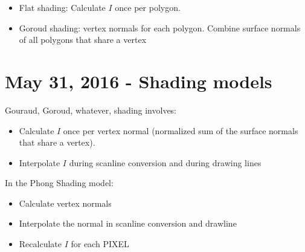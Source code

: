 \documentclass[11pt,fleqn]{article}
\theoremstyle{definition}
\begin{document}
\begin{itemize}
    \item Flat shading: Calculate $I$ once per polygon.
    \item Goroud shading: vertex normals for each polygon. Combine surface normals of
        all polygons that share a vertex
\end{itemize}

\section{May 31, 2016 - Shading models}

Gouraud, Goroud, whatever, shading involves:

\begin{itemize}
    \item Calculate $I$ once per vertex normal (normalized sum of the surface normals
        that share a vertex).
    \item Interpolate $I$ during scanline conversion and during drawing lines
\end{itemize}

In the Phong Shading model:

\begin{itemize}
    \item Calculate vertex normals
    \item Interpolate the normal in scanline conversion and drawline
    \item Recalculate $I$ for each PIXEL
\end{itemize}
\end{document}
